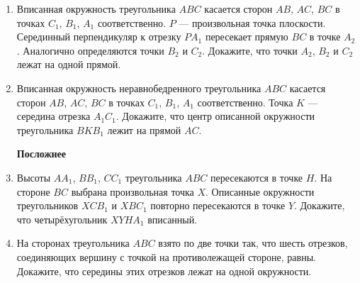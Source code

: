 \documentclass{article}
\begin{document}
\begin{enumerate}[label*=\protect\fbox{\arabic{enumi}}]
\item Вписанная окружность треугольника $ABC$ касается сторон $AB$, $AC$, $BC$ в точках $C_1$, $B_1$, $A_1$ соответственно. $P$ — произвольная точка плоскости. Серединный перпендикуляр к отрезку $PA_1$ пересекает прямую $BC$ в точке $A_2$. Аналогично определяются точки $B_2$ и $C_2$. Докажите, что точки $A_2$, $B_2$ и $C_2$ лежат на одной прямой.

\item Вписанная окружность неравнобедренного треугольника $ABC$ касается сторон $AB$, $AC$, $BC$ в точках $C_1$, $B_1$, $A_1$ соответственно. Точка $K$ — середина отрезка $A_1C_1$. Докажите, что центр описанной окружности треугольника $BKB_1$ лежит на прямой $AC$.

\newpage
\textbf{Посложнее}

\item Высоты $AA_1$, $BB_1$, $CC_1$ треугольника $ABC$ пересекаются в точке $H$. На стороне $BC$ выбрана произвольная точка $X$. Описанные окружности треугольников $XCB_1$ и $XBC_1$ повторно пересекаются в точке $Y$. Докажите, что четырёхугольник $XYHA_1$ вписанный.

\item На сторонах треугольника $ABC$ взято по две точки так, что шесть отрезков, соединяющих вершину с точкой на противолежащей стороне, равны. Докажите, что середины этих отрезков лежат на одной окружности.


\end{enumerate}
\end{document}
